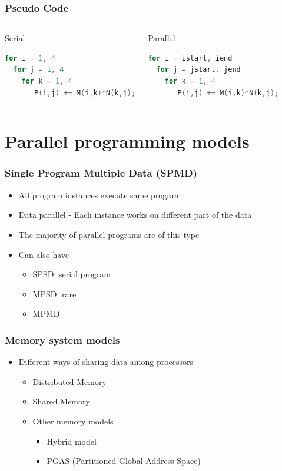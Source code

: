 \documentclass[10pt,t]{beamer}
\begin{document}
\begin{frame}[fragile]
  \frametitle{Pseudo Code}
  \begin{columns}
    \begin{exampleblock}{Serial}
      \begin{lstlisting}[language=C]
for i = 1, 4
  for j = 1, 4
    for k = 1, 4
       P(i,j) += M(i,k)*N(k,j);
      \end{lstlisting}
    \end{exampleblock}
    \begin{exampleblock}{Parallel}
      \begin{lstlisting}[language=C]
for i = istart, iend
  for j = jstart, jend
    for k = 1, 4
       P(i,j) += M(i,k)*N(k,j);
      \end{lstlisting}
    \end{exampleblock}
  \end{columns}
\end{frame}

\section{Parallel programming models}
\begin{frame}
  \frametitle{Single Program Multiple Data (SPMD)}
  \begin{itemize}
  \item All program instances execute same program
  \item Data parallel - Each instance works on different part of the data
  \item The majority of parallel programs are of this type
  \item Can also have
    \begin{itemize}
    \item SPSD: serial program
    \item MPSD: rare
    \item MPMD 
    \end{itemize}
  \end{itemize}
\end{frame}

\begin{frame}
  \frametitle{Memory system models}
  \begin{itemize}
  \item Different ways of sharing data among processors
    \begin{itemize}
    \item Distributed Memory
    \item Shared Memory
    \item Other memory models
      \begin{itemize}
      \item Hybrid model
      \item PGAS (Partitioned Global Address Space) 
      \end{itemize}
    \end{itemize}
  \end{itemize}
\end{frame}
\end{document}
